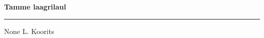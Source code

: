 \documentclass[10pt]{book}
\begin{document}
{
  \samepage
  \raggedbottom
  \raggedright
  \sloppy


  \vspace{0.2in}

  \noindent\begin{minipage}{.1\textwidth}
    \hfill\vspace{0.1in}
  \end{minipage}%
  \noindent\begin{minipage}{.8\textwidth}
    \centering
    \bfseries
    \large Tamme laagrilaul
  \end{minipage}%
  \noindent\begin{minipage}{.1\textwidth}
      \hfill\vspace{0.1in}
  \end{minipage}

  \nopagebreak[4]
  \vspace{0.1in}
  \nopagebreak[4]
  \hrule height 0.05ex
  \nopagebreak[4]
  \vspace{-0.05in}

  {\footnotesize None \hfill L. Koorits }\\
  \vspace{0.01in}



}
\end{document}
